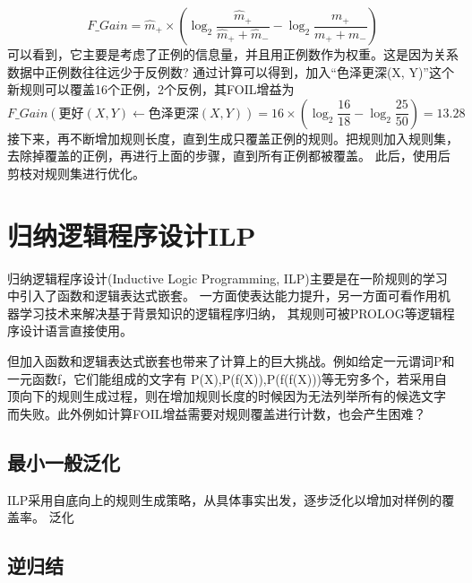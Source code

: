 \documentclass[UTF8]{article}
\begin{document}
    \begin{equation}\label{F_Gain}
        F\_Gain = \hat{m}_+ \times (\log_2{\frac{\hat{m}_+}{\hat{m}_+ + \hat{m}_-}} - \log_2{\frac{m_+}{m_+ + m_-}})
    \end{equation}
    可以看到，它主要是考虑了正例的信息量，并且用正例数作为权重。这是因为关系数据中正例数往往远少于反例数?
    通过计算可以得到，加入“色泽更深(X, Y)”这个新规则可以覆盖16个正例，2个反例，其FOIL增益为
    \begin{equation}
        F\_Gain(\text{更好}(X,Y)\leftarrow \text{色泽更深}(X,Y))=16\times(\log_2{\frac{16}{18}-\log_2{\frac{25}{50}}})=13.28
    \end{equation}
    接下来，再不断增加规则长度，直到生成只覆盖正例的规则。把规则加入规则集，去除掉覆盖的正例，再进行上面的步骤，直到所有正例都被覆盖。
    此后，使用后剪枝对规则集进行优化。
\section{归纳逻辑程序设计ILP}
    归纳逻辑程序设计(Inductive Logic Programming, ILP)主要是在一阶规则的学习中引入了函数和逻辑表达式嵌套。
    一方面使表达能力提升，另一方面可看作用机器学习技术来解决基于背景知识的逻辑程序归纳，
    其规则可被PROLOG等逻辑程序设计语言直接使用。

    但加入函数和逻辑表达式嵌套也带来了计算上的巨大挑战。例如给定一元谓词P和一元函数f，它们能组成的文字有
    P(X),P(f(X)),P(f(f(X)))等无穷多个，若采用自顶向下的规则生成过程，则在增加规则长度的时候因为无法列举所有的候选文字
    而失败。此外例如计算FOIL增益需要对规则覆盖进行计数，也会产生困难？

\subsection{最小一般泛化}
    ILP采用自底向上的规则生成策略，从具体事实出发，逐步泛化以增加对样例的覆盖率。
    泛化

\subsection{逆归结}
\end{document}
